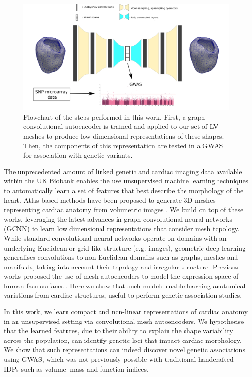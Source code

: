\begin{figure}
\includegraphics[width=\textwidth]{figs/flowchart.png}
\caption{Flowchart of the steps performed in this work. First, a graph-convolutional autoencoder is trained and applied to our set of LV meshes to produce low-dimensional representations of these shapes. Then, the components of this representation are tested in a GWAS for association with genetic variants.}
\label{fig:flowchart}
\end{figure}

The unprecedented amount of linked genetic and cardiac imaging data available within the UK Biobank \cite{ref_ukbb} enables the use unsupervised machine learning techniques to automatically learn a set of features that best describe the morphology of the heart. Atlas-based methods have been proposed to generate 3D meshes representing cardiac anatomy from volumetric images \cite{ref_rahman, ref_zhuang_regis_2O10}. We build on top of these works, leveraging the latest advances in graph-convolutional neural networks (GCNN) \cite{ref_bronstein_geom_DL} to learn low dimensional representations that consider mesh topology. While standard convolutional neural networks operate on domains with an underlying Euclidean or grid-like structure (e.g. images), geometric deep learning generalises convolutions to non-Euclidean domains such as graphs, meshes and manifolds, taking into account their topology and irregular structure. Previous works proposed the use of mesh autoencoders to model the expression space of human face surfaces \cite{ref_coma}. Here we show that such models enable learning anatomical variations from cardiac structures, useful to perform genetic association studies.

In this work, we learn compact and non-linear representations of cardiac anatomy in an unsupervised setting via convolutional mesh autoencoders. We hypothesise that the learned features, due to their ability to explain the shape variability across the population, can identify genetic loci that impact cardiac morphology. We show that such representations can indeed discover novel genetic associations using GWAS, which was not previously possible with traditional handcrafted IDPs such as volume, mass and function indices. 
